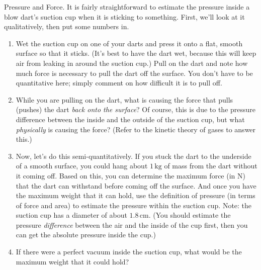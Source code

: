 \begin{aproblem}{Pressure and Force.} 
  It is fairly straightforward to estimate the pressure inside a blow
  dart's suction cup when it is sticking to something.  First, we'll
  look at it qualitatively, then put some numbers in.
  \begin{enumerate}
  \item Wet the suction cup on one of your darts and press it onto a
    flat, smooth surface so that it sticks.  (It's best to have the
    dart wet, because this will keep air from leaking in around the
    suction cup.)  Pull on the dart and note how much force is
    necessary to pull the dart off the surface.  You don't have to be
    quantitative here; simply comment on how difficult it is to pull
    off.

  \item While you are pulling on the dart, what is causing the force
    that pulls (pushes) the dart {\em back onto the surface}?  Of
    course, this is due to the pressure difference between the inside
    and the outside of the suction cup, but what {\em physically} is
    causing the force?  (Refer to the kinetic theory of gases to
    answer this.)

  \item Now, let's do this semi-quantitatively.  If you stuck the dart
    to the underside of a smooth surface, you could hang about $1\,
    \mbox{kg}$ of mass from the dart without it coming off.  Based on
    this, you can determine the maximum force (in N) that the dart can
    withstand before coming off the surface.  And once you have the
    maximum weight that it can hold, use the definition of pressure
    (in terms of force and area) to estimate the pressure within the
    suction cup.  Note: the suction cup has a diameter of about $1.8\,
    \mbox{cm}$.  (You should estimate the pressure {\em difference}
    between the air and the inside of the cup first, then you can get
    the absolute pressure inside the cup.)

  \item If there were a perfect vacuum inside the suction cup, what
    would be the maximum weight that it could hold?
  \end{enumerate}
\end{aproblem}



